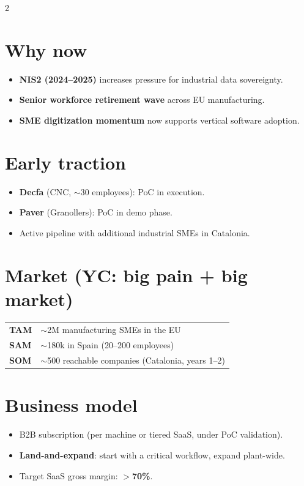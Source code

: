 \documentclass[10pt,a4paper]{article}
\begin{document}
\begin{multicols}{2}
\section{Why now}
\begin{itemize}[leftmargin=1em,itemsep=1pt,topsep=2pt]
\item \textbf{NIS2 (2024--2025)} increases pressure for industrial data sovereignty.
\item \textbf{Senior workforce retirement wave} across EU manufacturing.
\item \textbf{SME digitization momentum} now supports vertical software adoption.
\end{itemize}

\section{Early traction}
\begin{itemize}[leftmargin=1em,itemsep=1pt,topsep=2pt]
\item \textbf{Decfa} (CNC, $\sim$30 employees): PoC in execution.
\item \textbf{Paver} (Granollers): PoC in demo phase.
\item Active pipeline with additional industrial SMEs in Catalonia.
\end{itemize}

\columnbreak

\section{Market (YC: big pain + big market)}
\small
\renewcommand{\arraystretch}{1.15}
\begin{tabularx}{0.96\linewidth}{lX}
\toprule
\textbf{TAM} & $\sim$2M manufacturing SMEs in the EU \\
\textbf{SAM} & $\sim$180k in Spain (20--200 employees) \\
\textbf{SOM} & $\sim$500 reachable companies (Catalonia, years 1--2) \\
\bottomrule
\end{tabularx}
\normalsize

\section{Business model}
\begin{itemize}[leftmargin=1em,itemsep=1pt,topsep=2pt]
\item B2B subscription (per machine or tiered SaaS, under PoC validation).
\item \textbf{Land-and-expand}: start with a critical workflow, expand plant-wide.
\item Target SaaS gross margin: \textbf{$>$70\%}.
\end{itemize}


\end{multicols}
\end{document}
